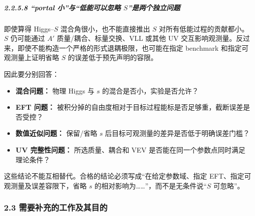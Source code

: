 \documentclass[
  chinese,
  UTF8]{ctexart}
\providecommand{\tightlist}{%
  \setlength{\itemsep}{0pt}\setlength{\parskip}{0pt}}
\begin{document}
\subparagraph{\texorpdfstring{2.2.5.8 ``portal 小''与``低能可以忽略
\(S\)''是两个独立问题}{2.2.5.8 ``portal 小''与``低能可以忽略 S''是两个独立问题}}\label{portal-ux5c0fux4e0eux4f4eux80fdux53efux4ee5ux5ffdux7565-sux662fux4e24ux4e2aux72ecux7acbux95eeux9898}

即使算得 Higgs--\(S\) 混合角很小，也不能直接推出 \(S\)
对所有低能过程的贡献都小。\(S\) 仍可能通过 \(A'\)
质量/耦合、标量交换、VLL 或其他 UV
交互影响观测量。反过来，即使不能构造一个严格的形式退耦极限，也可能在指定
benchmark 和指定可观测量上证明省略 \(S\) 的误差低于预先声明的容限。

因此要分别回答：

\begin{itemize}
\tightlist
\item
  \textbf{混合问题：} 物理 Higgs 与 \(s\) 的混合是否小，实验是否允许？
\item
  \textbf{EFT 问题：}
  被积分掉的自由度相对于目标过程能标是否足够重，截断误差是否受控？
\item
  \textbf{数值近似问题：} 保留/省略 \(s\)
  后目标可观测量的差异是否低于明确误差门槛？
\item
  \textbf{UV 完整性问题：} 所选质量、耦合和 VEV
  是否能在同一个参数点同时满足理论条件？
\end{itemize}

这些结论不能互相替代。合格的结论必须写成``在给定参数域、指定
EFT、指定可观测量及误差容限下，省略 \(s\)
的相对影响为\ldots\ldots''，而不是无条件说``\(S\) 可忽略''。

\subsubsection{2.3 需要补充的工作及其目的}\label{major-1-step-3}
\end{document}
